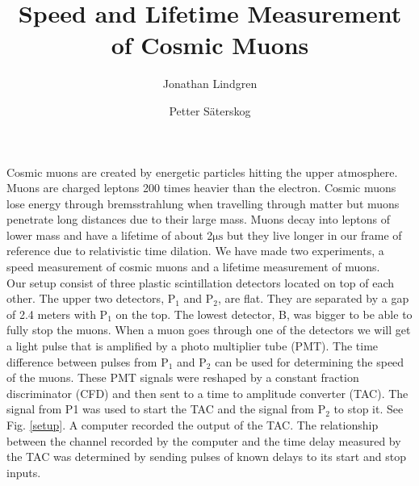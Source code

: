 \documentclass[10pt,twocolumn]{article}
\title{Speed and Lifetime Measurement of Cosmic Muons}
\author{Jonathan Lindgren \and Petter Säterskog}
\begin{document}
Cosmic muons are created by energetic particles hitting the upper atmosphere. Muons are charged leptons 200 times heavier than the electron. Cosmic muons lose energy through bremsstrahlung when travelling through matter but muons penetrate long distances due to their large mass\cite{PhysRevD.45.3051}. Muons decay into leptons of lower mass and have a lifetime of about 2$\mathrm{\mu s}$ but they live longer in our frame of reference due to relativistic time dilation\cite{frisch:342}. We have made two experiments, a speed measurement of cosmic muons and a lifetime measurement of muons.\\
Our setup consist of three plastic scintillation detectors located on top of each other. The upper two detectors, P$_1$ and P$_2$, are flat. They are separated by a gap of 2.4 meters with P$_1$ on the top. The lowest detector, B, was bigger to be able to fully stop the muons. When a muon goes through one of the detectors we will get a light pulse that is amplified by a photo multiplier tube (PMT). The time difference between pulses from P$_1$ and P$_2$ can be used for determining the speed of the muons. These PMT signals were reshaped by a constant fraction discriminator (CFD) and then sent to a time to amplitude converter (TAC). The signal from P1 was used to start the TAC and the signal from P$_2$ to stop it. See Fig. \ref{setup}. A computer recorded the output of the TAC. The relationship between the channel recorded by the computer and the time delay measured by the TAC was determined by sending pulses of known delays to its start and stop inputs.\\  %
\end{document}
